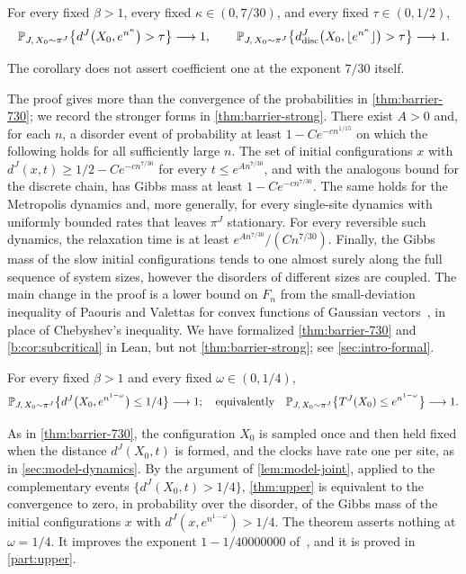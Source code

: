 \begin{corollary}\label{b:cor:subcritical}
For every fixed $\beta>1$, every fixed $\kappa\in(0,7/30)$, and every
fixed $\tau\in(0,1/2)$,
\[
 \mathbb P_{J,\,X_0\sim\pi^J}\bigl\{d^J\bigl(X_0,e^{n^\kappa}\bigr)>\tau\bigr\}
   \longrightarrow1,\qquad
 \mathbb P_{J,\,X_0\sim\pi^J}
   \bigl\{d^J_{\mathrm{disc}}\bigl(X_0,\lfloor e^{n^\kappa}\rfloor\bigr)>\tau\bigr\}
   \longrightarrow1.
\]
\end{corollary}

The corollary does not assert coefficient one at the exponent $7/30$
itself.

The proof gives more than the convergence of the probabilities in
\cref{thm:barrier-730}; we record the stronger forms in
\cref{thm:barrier-strong}. There exist $A>0$ and, for each $n$, a disorder
event of probability at least $1-Ce^{-cn^{1/15}}$ on which the following
holds for all sufficiently large $n$. The set of initial configurations $x$
with $d^J(x,t)\ge1/2-Ce^{-cn^{7/30}}$ for every $t\le e^{An^{7/30}}$, and
with the analogous bound for the discrete chain, has Gibbs mass at least
$1-Ce^{-cn^{7/30}}$. The same holds for the Metropolis dynamics and, more
generally, for every single-site dynamics with uniformly bounded rates that
leaves $\pi^J$ stationary. For every reversible such dynamics, the
relaxation time is at least $e^{An^{7/30}}/(Cn^{7/30})$. Finally, the Gibbs
mass of the slow initial configurations tends to one almost surely along the
full sequence of system sizes, however the disorders of different sizes are
coupled. The main change in the proof is a lower bound on $F_n$ from the
small-deviation inequality of Paouris and Valettas for convex functions of
Gaussian vectors~\cite[Theorem~2.1 and
Remark~2.4(3)]{paouris-valettas-2018}, in place of Chebyshev's inequality.
We have formalized \cref{thm:barrier-730} and \cref{b:cor:subcritical} in
Lean, but not \cref{thm:barrier-strong}; see \cref{sec:intro-formal}.

\begin{theorem}\label{thm:upper}
For every fixed $\beta>1$ and every fixed $\omega\in(0,1/4)$,
\[
 \mathbb P_{J,\,X_0\sim\pi^J}\bigl\{d^J\bigl(X_0,e^{n^{1-\omega}}\bigr)\le 1/4\bigr\}\longrightarrow1;
 \quad\text{equivalently}\quad
 \mathbb P_{J,\,X_0\sim\pi^J}\bigl\{T^J(X_0)\le e^{n^{1-\omega}}\bigr\}\longrightarrow1 .
\]
\end{theorem}

As in \cref{thm:barrier-730}, the configuration $X_0$ is sampled once and
then held fixed when the distance $d^J(X_0,t)$ is formed, and the clocks
have rate one per site, as in \cref{sec:model-dynamics}. By the argument of
\cref{lem:model-joint}, applied to the complementary events
$\{d^J(X_0,t)>1/4\}$, \cref{thm:upper} is equivalent to the convergence to
zero, in probability over the disorder, of the Gibbs mass of the initial
configurations $x$ with $d^J(x,e^{n^{1-\omega}})>1/4$. The theorem asserts
nothing at $\omega=1/4$. It improves the exponent $1-1/40000000$
of~\cite[Theorem~1]{oai-typical-upper}, and it is proved in
\cref{part:upper}. \statusIntroShort

